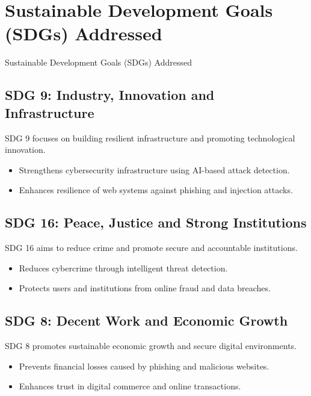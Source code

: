 \documentclass[aspectratio=169,xcolor=dvipsnames]{beamer}
\begin{document}
\section*{Sustainable Development Goals (SDGs) Addressed}
\begin{frame}{Sustainable Development Goals (SDGs) Addressed}

\subsection*{SDG 9: Industry, Innovation and Infrastructure}

SDG 9 focuses on building resilient infrastructure and promoting technological innovation.

\begin{itemize}
    \item Strengthens cybersecurity infrastructure using AI-based attack detection.
    \item Enhances resilience of web systems against phishing and injection attacks.
\end{itemize}


\subsection*{SDG 16: Peace, Justice and Strong Institutions}

SDG 16 aims to reduce crime and promote secure and accountable institutions.

\begin{itemize}
    \item Reduces cybercrime through intelligent threat detection.
    \item Protects users and institutions from online fraud and data breaches.
\end{itemize}


\subsection*{SDG 8: Decent Work and Economic Growth}

SDG 8 promotes sustainable economic growth and secure digital environments.

\begin{itemize}
    \item Prevents financial losses caused by phishing and malicious websites.
    \item Enhances trust in digital commerce and online transactions.
\end{itemize}



\end{frame}
\end{document}
